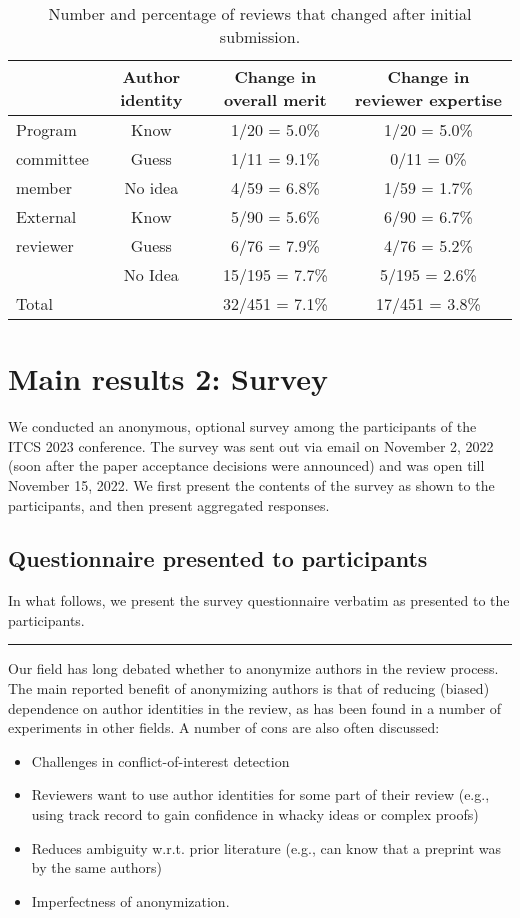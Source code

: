 \documentclass{article}
\begin{document}
\begin{table}
\centering
\begin{tabular}{|l|c|c|c|}   
    \hline
     & Author identity & Change  in overall merit & Change in reviewer expertise \\\hline
     Program & Know &1/20 = 5.0\% & 1/20 = 5.0\%  \\
     committee & Guess&1/11 = 9.1\% & 0/11 = 0\%  \\
     member& No idea &4/59 = 6.8\% & 1/59 = 1.7\%  \\\hline
     External & Know &5/90 = 5.6\% & 6/90 = 6.7\%  \\
     reviewer & Guess&6/76 = 7.9\% &  4/76 = 5.2\%  \\
     & No Idea &15/195 = 7.7\% & 5/195 = 2.6\%  \\\hline
     Total &  & 32/451 = 7.1\% & 17/451 = 3.8\%  \\\hline
\end{tabular}
\caption{Number and percentage of reviews that changed after initial submission.\label{TabNumChanged}} 
\end{table} 




\section{Main results 2: Survey}
\label{SecSurvey}

We conducted an anonymous, optional survey among the participants of the ITCS 2023 conference. The survey was sent out via email on November 2, 2022 (soon after the paper acceptance decisions were announced) and was open till November 15, 2022. We first present the contents of the survey  as shown to the participants, and then present aggregated responses. 

\subsection{Questionnaire presented to participants} 
In what follows, we present the survey questionnaire verbatim as presented to the participants. 

\noindent\rule{\textwidth}{1pt}
Our field has long debated whether to anonymize authors in the review process. The main reported benefit of anonymizing authors is that of reducing (biased) dependence on author identities in the review, as has been found in a number of experiments in other fields. A number of cons are also often discussed: 
\begin{itemize}
\item Challenges in conflict-of-interest detection
\item Reviewers want to use author identities for some part of their review (e.g., using track record to gain confidence in whacky ideas or complex proofs)
\item Reduces ambiguity w.r.t. prior literature (e.g., can know that a preprint was by the same authors)
\item Imperfectness of anonymization.
\end{itemize}
\end{document}
